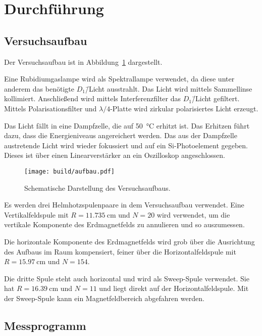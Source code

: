 \section{Durchführung}%
\label{sec:durchfuehrung}

\subsection{Versuchsaufbau}%
\label{sub:versuchsaufbau}

Der Versuchsaufbau ist in Abbildung~\ref{fig:aufbau} dargestellt.

Eine Rubidiumgaslampe wird als Spektrallampe verwendet, da diese
unter anderem das benötigte $D_1$\=/Licht ausstrahlt.
Das Licht wird mittels Sammellinse kollimiert.
Anschließend wird mittels Interferenzfilter das $D_1$\=/Licht gefiltert.
Mittels Polarisationsfilter und $\lambda/4$-Platte wird zirkular polarisiertes
Licht erzeugt.

Das Licht fällt in eine Dampfzelle, die auf \SI{50}{\celsius} erhitzt ist.
Das Erhitzen führt dazu, dass die Energieniveaus angereichert werden.
Das aus der Dampfzelle austretende Licht wird wieder fokussiert und auf ein
Si-Photoelement gegeben.
Dieses ist über einen Linearverstärker an ein Oszilloskop angeschlossen.

\begin{figure}[ht]
  \centering
  \texttt{[image: build/aufbau.pdf]}
  \caption{Schematische Darstellung des Versuchsaufbaus.~\cite{anleitung}}%
  \label{fig:aufbau}
\end{figure}

Es werden drei Helmhotzspulenpaare in dem Versuchsaufbau verwendet.
Eine Vertikalfeldspule mit
$R = \SI{11.735}{\centi\meter}$ und $N = \num{20}$
wird verwendet, um die vertikale Komponente des Erdmagnetfelds zu annulieren
und so auszumessen.

Die horizontale Komponente des Erdmagnetfelds wird grob über die Ausrichtung
des Aufbaus im Raum kompensiert,
feiner über die Horizontalfeldspule mit
$R = \SI{15.97}{\centi\meter}$ und $N = \num{154}$.

Die dritte Spule steht auch horizontal und wird als Sweep-Spule verwendet.
Sie hat
$R = \SI{16.39}{\centi\meter}$ und $N = \num{11}$
und liegt direkt auf der Horizontalfeldspule.
Mit der Sweep-Spule kann ein Magnetfeldbereich abgefahren werden.


\subsection{Messprogramm}%
\label{sub:messprogramm}

